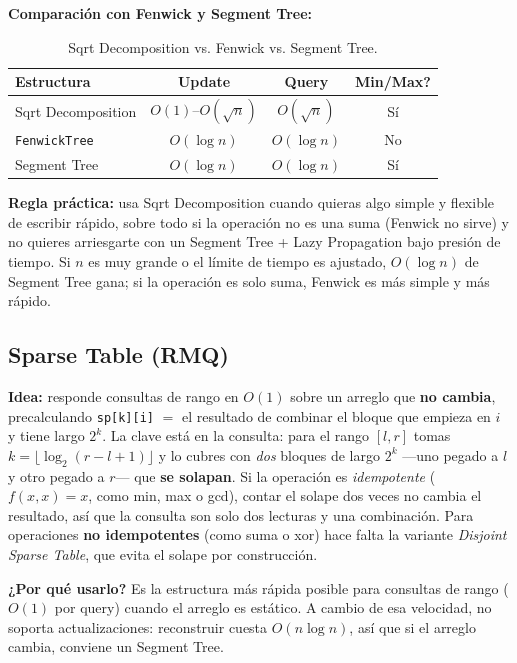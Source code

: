 \documentclass[10pt,a4paper,twocolumn]{article}
\begin{document}
\textbf{Comparación con Fenwick y Segment Tree:}

\begin{table}[H]
\raggedright
\scriptsize
\setlength{\tabcolsep}{3pt}
\begin{tabular}{|l|c|c|c|}
\hline
\textbf{Estructura} & \textbf{Update} & \textbf{Query} & \textbf{Min/Max?} \\
\hline
Sqrt Decomposition & $O(1)$–$O(\sqrt n)$ & $O(\sqrt n)$ & Sí \\
\hline
\texttt{FenwickTree} & $O(\log n)$ & $O(\log n)$ & No \\
\hline
Segment Tree & $O(\log n)$ & $O(\log n)$ & Sí \\
\hline
\end{tabular}
\caption{Sqrt Decomposition vs. Fenwick vs. Segment Tree.}
\end{table}

\textbf{Regla práctica:} usa Sqrt Decomposition cuando quieras algo
simple y flexible de escribir rápido, sobre todo si la operación no
es una suma (Fenwick no sirve) y no quieres arriesgarte con un
Segment Tree + Lazy Propagation bajo presión de tiempo. Si $n$ es muy
grande o el límite de tiempo es ajustado, $O(\log n)$ de Segment Tree
gana; si la operación es solo suma, Fenwick es más simple y más
rápido.


\subsection{Sparse Table (RMQ)}

\textbf{Idea:} responde consultas de rango en $O(1)$ sobre un arreglo
que \textbf{no cambia}, precalculando \texttt{sp[k][i]} $=$ el
resultado de combinar el bloque que empieza en $i$ y tiene largo
$2^k$. La clave está en la consulta: para el rango $[l,r]$ tomas
$k=\lfloor\log_2(r-l+1)\rfloor$ y lo cubres con \emph{dos} bloques de
largo $2^k$ —uno pegado a $l$ y otro pegado a $r$— que
\textbf{se solapan}. Si la operación es \emph{idempotente}
($f(x,x)=x$, como min, max o gcd), contar el solape dos veces no
cambia el resultado, así que la consulta son solo dos lecturas y una
combinación. Para operaciones \textbf{no idempotentes} (como suma o
xor) hace falta la variante \emph{Disjoint Sparse Table}, que evita el
solape por construcción.

\textbf{¿Por qué usarlo?} Es la estructura más rápida posible para
consultas de rango ($O(1)$ por query) cuando el arreglo es estático.
A cambio de esa velocidad, no soporta actualizaciones: reconstruir
cuesta $O(n\log n)$, así que si el arreglo cambia, conviene un
Segment Tree.
\end{document}
